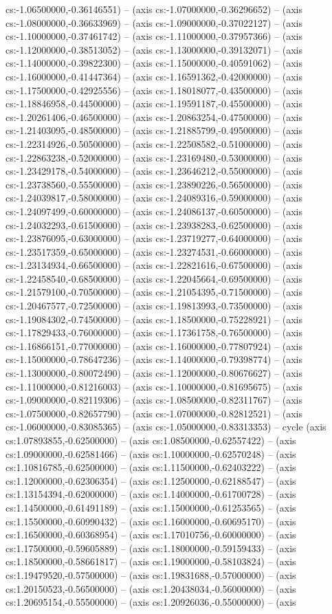 cs:-1.06500000,-0.36146551) -- (axis cs:-1.07000000,-0.36296652) -- (axis cs:-1.08000000,-0.36633969) -- (axis cs:-1.09000000,-0.37022127) -- (axis cs:-1.10000000,-0.37461742) -- (axis cs:-1.11000000,-0.37957366) -- (axis cs:-1.12000000,-0.38513052) -- (axis cs:-1.13000000,-0.39132071) -- (axis cs:-1.14000000,-0.39822300) -- (axis cs:-1.15000000,-0.40591062) -- (axis cs:-1.16000000,-0.41447364) -- (axis cs:-1.16591362,-0.42000000) -- (axis cs:-1.17500000,-0.42925556) -- (axis cs:-1.18018077,-0.43500000) -- (axis cs:-1.18846958,-0.44500000) -- (axis cs:-1.19591187,-0.45500000) -- (axis cs:-1.20261406,-0.46500000) -- (axis cs:-1.20863254,-0.47500000) -- (axis cs:-1.21403095,-0.48500000) -- (axis cs:-1.21885799,-0.49500000) -- (axis cs:-1.22314926,-0.50500000) -- (axis cs:-1.22508582,-0.51000000) -- (axis cs:-1.22863238,-0.52000000) -- (axis cs:-1.23169480,-0.53000000) -- (axis cs:-1.23429178,-0.54000000) -- (axis cs:-1.23646212,-0.55000000) -- (axis cs:-1.23738560,-0.55500000) -- (axis cs:-1.23890226,-0.56500000) -- (axis cs:-1.24039817,-0.58000000) -- (axis cs:-1.24089316,-0.59000000) -- (axis cs:-1.24097499,-0.60000000) -- (axis cs:-1.24086137,-0.60500000) -- (axis cs:-1.24032293,-0.61500000) -- (axis cs:-1.23938283,-0.62500000) -- (axis cs:-1.23876095,-0.63000000) -- (axis cs:-1.23719277,-0.64000000) -- (axis cs:-1.23517359,-0.65000000) -- (axis cs:-1.23274531,-0.66000000) -- (axis cs:-1.23134934,-0.66500000) -- (axis cs:-1.22821616,-0.67500000) -- (axis cs:-1.22458540,-0.68500000) -- (axis cs:-1.22045664,-0.69500000) -- (axis cs:-1.21579100,-0.70500000) -- (axis cs:-1.21054395,-0.71500000) -- (axis cs:-1.20467577,-0.72500000) -- (axis cs:-1.19813993,-0.73500000) -- (axis cs:-1.19084302,-0.74500000) -- (axis cs:-1.18500000,-0.75228921) -- (axis cs:-1.17829433,-0.76000000) -- (axis cs:-1.17361758,-0.76500000) -- (axis cs:-1.16866151,-0.77000000) -- (axis cs:-1.16000000,-0.77807924) -- (axis cs:-1.15000000,-0.78647236) -- (axis cs:-1.14000000,-0.79398774) -- (axis cs:-1.13000000,-0.80072490) -- (axis cs:-1.12000000,-0.80676627) -- (axis cs:-1.11000000,-0.81216003) -- (axis cs:-1.10000000,-0.81695675) -- (axis cs:-1.09000000,-0.82119306) -- (axis cs:-1.08500000,-0.82311767) -- (axis cs:-1.07500000,-0.82657790) -- (axis cs:-1.07000000,-0.82812521) -- (axis cs:-1.06000000,-0.83085365) -- (axis cs:-1.05000000,-0.83313353) -- cycle (axis cs:1.07893855,-0.62500000) -- (axis cs:1.08500000,-0.62557422) -- (axis cs:1.09000000,-0.62581466) -- (axis cs:1.10000000,-0.62570248) -- (axis cs:1.10816785,-0.62500000) -- (axis cs:1.11500000,-0.62403222) -- (axis cs:1.12000000,-0.62306354) -- (axis cs:1.12500000,-0.62188547) -- (axis cs:1.13154394,-0.62000000) -- (axis cs:1.14000000,-0.61700728) -- (axis cs:1.14500000,-0.61491189) -- (axis cs:1.15000000,-0.61253565) -- (axis cs:1.15500000,-0.60990432) -- (axis cs:1.16000000,-0.60695170) -- (axis cs:1.16500000,-0.60368954) -- (axis cs:1.17010756,-0.60000000) -- (axis cs:1.17500000,-0.59605889) -- (axis cs:1.18000000,-0.59159433) -- (axis cs:1.18500000,-0.58661817) -- (axis cs:1.19000000,-0.58103824) -- (axis cs:1.19479520,-0.57500000) -- (axis cs:1.19831688,-0.57000000) -- (axis cs:1.20150523,-0.56500000) -- (axis cs:1.20438034,-0.56000000) -- (axis cs:1.20695154,-0.55500000) -- (axis cs:1.20926036,-0.55000000) -- (axis 